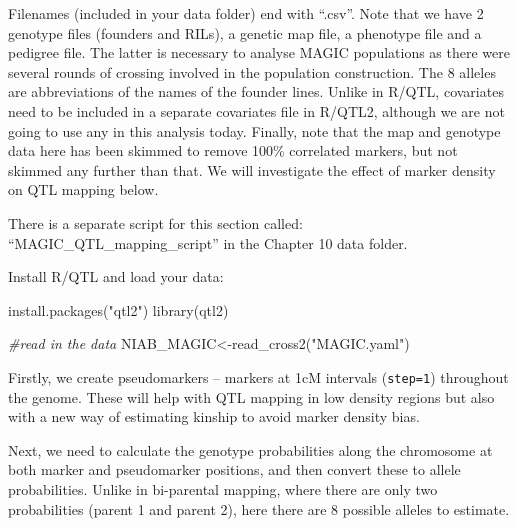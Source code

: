 \documentclass[
]{book}
\makeatletter
\newenvironment{Shaded}{\begin{snugshade}}{\end{snugshade}}
\newcommand{\AttributeTok}[1]{\textcolor[rgb]{0.77,0.63,0.00}{#1}}
\newcommand{\CommentTok}[1]{\textcolor[rgb]{0.56,0.35,0.01}{\textit{#1}}}
\newcommand{\DecValTok}[1]{\textcolor[rgb]{0.00,0.00,0.81}{#1}}
\newcommand{\FunctionTok}[1]{\textcolor[rgb]{0.00,0.00,0.00}{#1}}
\newcommand{\NormalTok}[1]{#1}
\newcommand{\OtherTok}[1]{\textcolor[rgb]{0.56,0.35,0.01}{#1}}
\newcommand{\SpecialCharTok}[1]{\textcolor[rgb]{0.00,0.00,0.00}{#1}}
\newcommand{\StringTok}[1]{\textcolor[rgb]{0.31,0.60,0.02}{#1}}
\newenvironment{kframe}{%
\medskip{}
\setlength{\fboxsep}{.8em}
 \def\at@end@of@kframe{}%
 \ifinner\ifhmode%
  \def\at@end@of@kframe{\end{minipage}}%
  \begin{minipage}{\columnwidth}%
 \fi\fi%
 \def\FrameCommand##1{\hskip\@totalleftmargin \hskip-\fboxsep
 \colorbox{shadecolor}{##1}\hskip-\fboxsep
     \hskip-\linewidth \hskip-\@totalleftmargin \hskip\columnwidth}%
 \MakeFramed {\advance\hsize-\width
   \@totalleftmargin\z@ \linewidth\hsize
   \@setminipage}}%
 {\par\unskip\endMakeFramed%
 \at@end@of@kframe}
\newenvironment{rmdblock}[1]
  {
  \begin{itemize}
  \renewcommand{\labelitemi}{
    \raisebox{-.7\height}[0pt][0pt]{
      {\setkeys{Gin}{width=3em,keepaspectratio}\texttt{[image: images/\#1]}}
    }
  }
  \setlength{\fboxsep}{1em}
  \begin{kframe}
  \item
  }
  {
  \end{kframe}
  \end{itemize}
  }
\newenvironment{rmdnote}
  {\begin{rmdblock}{note}}
  {\end{rmdblock}}
\makeatother
\begin{document}
Filenames (included in your data folder) end with ``.csv''. Note that we have 2 genotype files (founders and RILs), a genetic map file, a phenotype file and a pedigree file. The latter is necessary to analyse MAGIC populations as there were several rounds of crossing involved in the population construction. The 8 alleles are abbreviations of the names of the founder lines. Unlike in R/QTL, covariates need to be included in a separate covariates file in R/QTL2, although we are not going to use any in this analysis today. Finally, note that the map and genotype data here has been skimmed to remove 100\% correlated markers, but not skimmed any further than that. We will investigate the effect of marker density on QTL mapping below.

\begin{rmdnote}
There is a separate script for this section called: ``MAGIC\_QTL\_mapping\_script'' in the Chapter 10 data folder.
\end{rmdnote}

Install R/QTL and load your data:

\begin{Shaded}
\begin{Highlighting}[]
\FunctionTok{install.packages}\NormalTok{(}\StringTok{"qtl2"}\NormalTok{)}
\FunctionTok{library}\NormalTok{(qtl2)}

\CommentTok{\#read in the data}
\NormalTok{NIAB\_MAGIC}\OtherTok{\textless{}{-}}\FunctionTok{read\_cross2}\NormalTok{(}\StringTok{"MAGIC.yaml"}\NormalTok{)}
\end{Highlighting}
\end{Shaded}

Firstly, we create pseudomarkers -- markers at 1cM intervals (\texttt{step=1}) throughout the genome. These will help with QTL mapping in low density regions but also with a new way of estimating kinship to avoid marker density bias.

\begin{Shaded}
\end{Shaded}

Next, we need to calculate the genotype probabilities along the chromosome at both marker and pseudomarker positions, and then convert these to allele probabilities. Unlike in bi-parental mapping, where there are only two probabilities (parent 1 and parent 2), here there are 8 possible alleles to estimate.
\end{document}
